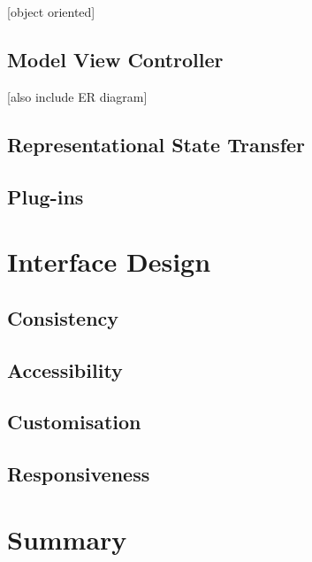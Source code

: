\documentclass{l4proj}
\begin{document}
[object oriented]

\subsection{Model View Controller}

[also include ER diagram]

\subsection{Representational State Transfer}

\subsection{Plug-ins}

\section{Interface Design}

\subsection{Consistency}

\subsection{Accessibility}

\subsection{Customisation}

\subsection{Responsiveness}

\section*{Summary}



\end{document}
